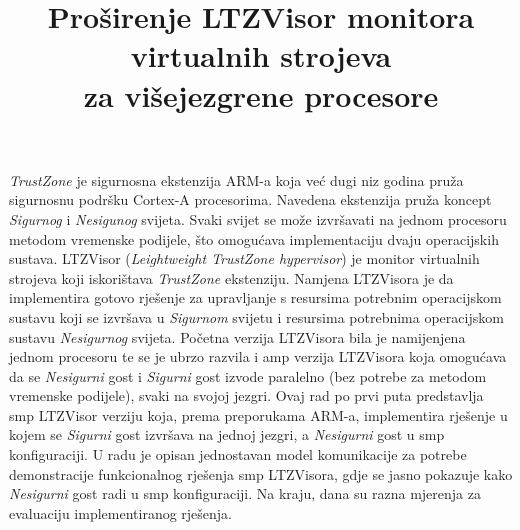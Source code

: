 \documentclass[times, utf8, diplomski, numeric]{fer}
\begin{document}
\glsaddall
\printglossary[type=\acronymtype,title=Kazalo pojmova]

\title{Proširenje LTZVisor monitora virtualnih strojeva \\za višejezgrene procesore}
\begin{sazetak}
\textit{TrustZone} je sigurnosna ekstenzija ARM-a koja već dugi niz godina pruža sigurnosnu podršku Cortex-A procesorima.
Navedena ekstenzija pruža koncept \textit{Sigurnog}  i \textit{Nesigunog}  svijeta.
Svaki svijet se može izvršavati na jednom procesoru metodom vremenske podijele, što omogućava implementaciju
dvaju operacijskih sustava. LTZVisor (\textit{Leightweight TrustZone hypervisor}) je monitor virtualnih strojeva koji
iskorištava \textit{TrustZone} ekstenziju. Namjena LTZVisora je da implementira gotovo rješenje za
upravljanje s resursima potrebnim operacijskom sustavu koji se izvršava u \textit{Sigurnom} svijetu i resursima
potrebnima operacijskom sustavu \textit{Nesigurnog} svijeta. Početna verzija LTZVisora bila je namijenjena jednom
procesoru te se je ubrzo razvila i \gls{amp}  verzija LTZVisora koja omogućava da se
\textit{Nesigurni} gost i \textit{Sigurni} gost izvode paralelno (bez potrebe za metodom vremenske podijele), svaki na
svojoj jezgri.
Ovaj rad po prvi puta predstavlja \gls{smp}  LTZVisor verziju koja, prema preporukama ARM-a,
implementira rješenje u kojem se \textit{Sigurni} gost izvršava na jednoj jezgri, a \textit{Nesigurni} gost u \gls{smp}
konfiguraciji. U radu je opisan jednostavan model komunikacije za potrebe demonstracije funkcionalnog rješenja
\gls{smp} LTZVisora, gdje se jasno pokazuje kako \textit{Nesigurni} gost radi u \gls{smp} konfiguraciji. Na kraju, dana su
razna mjerenja za evaluaciju implementiranog rješenja.

\end{sazetak}
\end{document}
